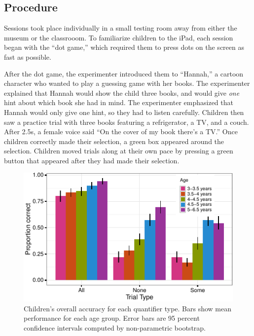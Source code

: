\documentclass[10pt, letterpaper]{article}
\newenvironment{CodeChunk}{}{}
\begin{document}
\subsection{Procedure}\label{procedure}

Sessions took place individually in a small testing room away from
either the museum or the classrooom. To familiarize children to the
iPad, each session began with the ``dot game,'' which required them to
press dots on the screen as fast as possible.

After the dot game, the experimenter introduced them to ``Hannah,'' a
cartoon character who wanted to play a guessing game with her books. The
experimenter explained that Hannah would show the child three books, and
would give \emph{one} hint about which book she had in mind. The
experimenter emphasized that Hannah would only give one hint, so they
had to listen carefully. Children then saw a practice trial with three
books featuring a refrigerator, a TV, and a couch. After 2.5s, a female
voice said ``On the cover of my book there's a TV.'' Once children
correctly made their selection, a green box appeared around the
selection. Children moved trials along at their own pace by pressing a
green button that appeared after they had made their selection.

\begin{CodeChunk}
\begin{figure}[t]
\includegraphics{figs/overall_acc-1} \caption[Children's overall accuracy for each quantifier type]{Children's overall accuracy for each quantifier type. Bars show mean performance for each age group. Error bars are 95 percent confidence intervals computed by non-parametric bootstrap.}\label{fig:overall_acc}
\end{figure}
\end{CodeChunk}
\end{document}
